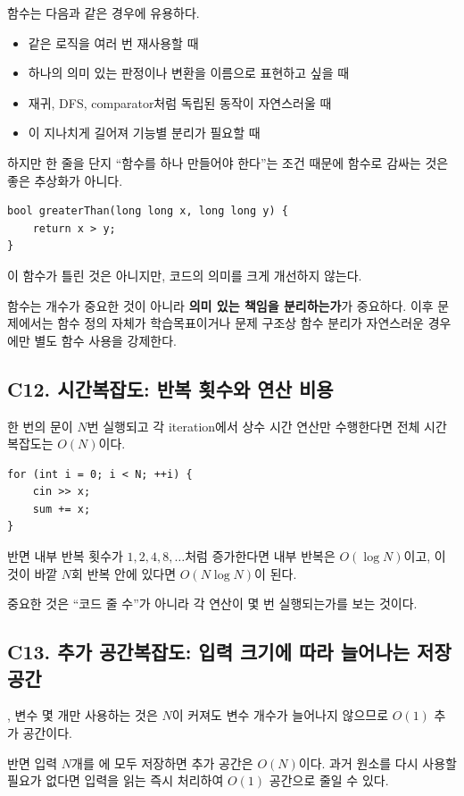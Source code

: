 함수는 다음과 같은 경우에 유용하다.
\begin{itemize}
  \item 같은 로직을 여러 번 재사용할 때
  \item 하나의 의미 있는 판정이나 변환을 이름으로 표현하고 싶을 때
  \item 재귀, DFS, comparator처럼 독립된 동작이 자연스러울 때
  \item {}이 지나치게 길어져 기능별 분리가 필요할 때
\end{itemize}

하지만  한 줄을 단지 ``함수를 하나 만들어야 한다''는 조건 때문에 함수로 감싸는 것은 좋은 추상화가 아니다.
\begin{lstlisting}
bool greaterThan(long long x, long long y) {
    return x > y;
}
\end{lstlisting}
이 함수가 틀린 것은 아니지만, 코드의 의미를 크게 개선하지 않는다.

\begin{keybox}[함수 사용 원칙]
함수는 개수가 중요한 것이 아니라 \textbf{의미 있는 책임을 분리하는가}가 중요하다. 이후 문제에서는 함수 정의 자체가 학습목표이거나 문제 구조상 함수 분리가 자연스러운 경우에만 별도 함수 사용을 강제한다.
\end{keybox}

\subsection{C12. 시간복잡도: 반복 횟수와 연산 비용}
한 번의 문이 $N$번 실행되고 각 iteration에서 상수 시간 연산만 수행한다면 전체 시간복잡도는 $O(N)$이다.
\begin{lstlisting}
for (int i = 0; i < N; ++i) {
    cin >> x;
    sum += x;
}
\end{lstlisting}

반면 내부 반복 횟수가 $1,2,4,8,\dots$처럼 증가한다면 내부 반복은 $O(\log N)$이고, 이것이 바깥 $N$회 반복 안에 있다면 $O(N\log N)$이 된다.

중요한 것은 ``코드 줄 수''가 아니라 각 연산이 몇 번 실행되는가를 보는 것이다.

\subsection{C13. 추가 공간복잡도: 입력 크기에 따라 늘어나는 저장공간}
,  변수 몇 개만 사용하는 것은 $N$이 커져도 변수 개수가 늘어나지 않으므로 $O(1)$ 추가 공간이다.

반면 입력 $N$개를 에 모두 저장하면 추가 공간은 $O(N)$이다. 과거 원소를 다시 사용할 필요가 없다면 입력을 읽는 즉시 처리하여 $O(1)$ 공간으로 줄일 수 있다.

